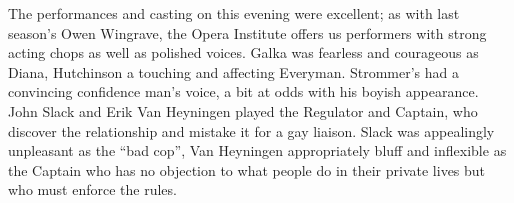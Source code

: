 The performances and casting on this evening were excellent; as with last season’s Owen Wingrave, the Opera Institute offers us performers with strong acting chops as well as polished voices. Galka was fearless and courageous as Diana, Hutchinson a touching and affecting Everyman. Strommer’s had a convincing confidence man’s voice, a bit at odds with his boyish appearance. John Slack and Erik Van Heyningen played the Regulator and Captain, who discover the relationship and mistake it for a gay liaison. Slack was appealingly unpleasant as the “bad cop”, Van Heyningen appropriately bluff and inflexible as the Captain who has no objection to what people do in their private lives but who must enforce the rules.
